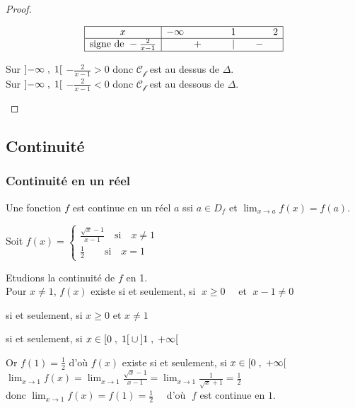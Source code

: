\begin{proof}
\begin{enumerate}
  \[\begin{array}{|c|ccccc|}
\hline
x & -\infty & & 1 & & 2\\ \hline
\text{signe de }-\frac{2}{x-1}  & & +\qquad &|  & \quad - & \\
\hline
\end{array}\]
 
  Sur $ \left]-\infty \;,\; 1\right[ $ $-\frac{2}{x-1} > 0  $ donc $ \mathcal{C_{f}} $ est au dessus de $ \Delta. $\\
   Sur $ \left]-\infty \;,\; 1\right[ $ $-\frac{2}{x-1} < 0  $ donc $ \mathcal{C_{f}} $ est au dessous de $ \Delta. $
\end{enumerate}
\end{proof}
\subsection{Continuité}
\subsubsection*{Continuité en un réel}

\begin{definition}
Une fonction $ f $ est continue en un réel $ a $ ssi $ a\in D_{f} $ et $\displaystyle \lim_{x \to a}f(x)=f(a) $.
\end{definition}


\begin{example}
Soit $ f (x)=\left\{\begin{array}{l} \frac{\sqrt{x}-1}{x-1}\quad \textrm{si} \quad x\neq 1 \\ \frac{1}{2}\quad \quad\textrm{si}\quad x= 1  \end{array} \right.$


Etudions la continuité   de $ f $ en 1.\\
 Pour $x\neq 1  $, $ f(x) $ existe si et seulement, si $\; x\geq 0 \quad$ et $\; x-1 \neq 0 $
 
si et seulement, si \quad $x\geq 0$ \quad   et $x\neq 1$

si et seulement, si $x\in \left[0 \;,\; 1\right[\cup\left]1 \;,\; +\infty\right[$

Or $ f(1)= \frac{1}{2}$  d'où $ f(x) $ existe si et seulement, si  $x\in \left[0 \;,\; +\infty\right[  $ \\
$ \displaystyle\lim_{x \to 1}f(x)=\displaystyle\lim_{x \to 1}\frac{\sqrt{x}-1}{x-1}= \displaystyle\lim_{x \to 1}\frac{1}{\sqrt{x}+1}= \frac{1}{2}$ \\donc $\displaystyle \lim_{x \to 1}f(x)=f(1)=\frac{1}{2}\quad$ d'où $\; f $ est continue en $ 1. $
\end{example}

